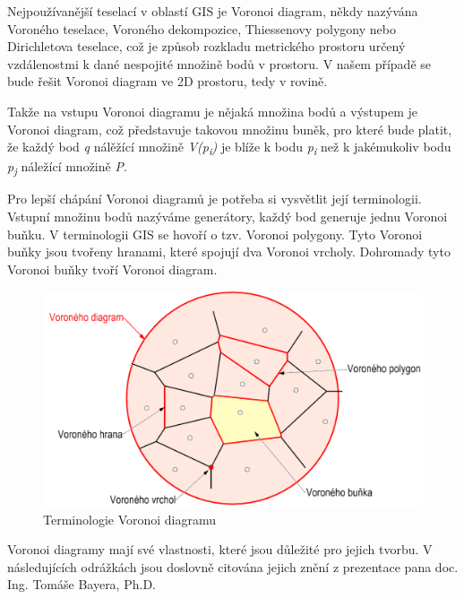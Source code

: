 Nejpoužívanější teselací v oblastí GIS je Voronoi diagram, někdy nazývána Voroné\-ho teselace, Voroného dekompozice,
Thiessenovy polygony nebo Dirichletova teselace, což je způsob rozkladu 
metrického prostoru určený vzdálenostmi k dané nespojité množině bodů v prostoru.
V našem případě se bude řešit Voronoi diagram ve 2D prostoru, tedy v rovině.

Takže na vstupu Voronoi diagramu je nějaká množina bodů a výstupem je Voronoi diagram, 
což představuje takovou množinu buněk, pro které bude platit, že každý bod
\textit{q} nálěžící množině \textit{V(p\textsubscript{i})} je blíže k bodu
\textit{p\textsubscript{i}} než k jakémukoliv
bodu \textit{p\textsubscript{j}} náležící množině \textit{P}.  \cite{bayer-voronoi}

Pro lepší chápání Voronoi diagramů je potřeba si vysvětlit její terminologii.
Vstup\-ní množinu bodů nazýváme generátory, každý bod generuje jednu Voronoi buňku. V 
terminologii GIS se hovoří o tzv. Voronoi polygony. Tyto Voronoi buňky jsou tvořeny hranami,
které spojují dva Voronoi vrcholy. Dohromady tyto Voronoi buňky tvoří Voronoi diagram.  

\begin{figure}[H] \centering
    \includegraphics[width=400pt]{./pictures/bayer-voronoi-terminologie.png}
    \caption[Terminologie Voronoi diagramu]{Terminologie Voronoi diagramu \cite{bayer-voronoi}}
	\label{fig:bayer-voronoi-terminologie}              
\end{figure}

Voronoi diagramy mají své vlastnosti, které jsou důležité pro jejich tvorbu. V následujících
odrážkách jsou doslovně citována jejich znění z prezentace pana doc. Ing. Tomáše Bayera, Ph.D.

